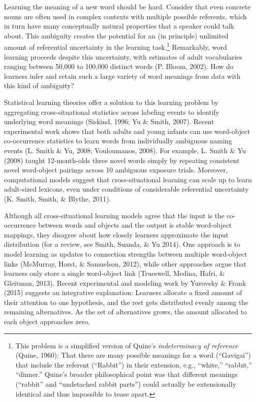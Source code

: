 \documentclass[authoryear, review]{elsarticle}
\begin{document}
Learning the meaning of a new word should be hard. Consider that even
concrete nouns are often used in complex contexts with multiple possible
referents, which in turn have many conceptually natural properties that
a speaker could talk about. This ambiguity creates the potential for an
(in principle) unlimited amount of referential uncertainty in the
learning task.\footnote{This problem is a simplified version of Quine's
  \textit{indeterminacy of reference} (Quine, 1960): That there are many
  possible meanings for a word (``Gavigai'') that include the referent
  (``Rabbit'') in their extension, e.g., ``white,'' ``rabbit,''
  ``dinner.'' Quine's broader philosophical point was that different
  meanings (``rabbit'' and ``undetached rabbit parts'') could actually
  be extensionally identical and thus impossible to tease apart.}
Remarkably, word learning proceeds despite this uncertainty, with
estimates of adult vocabularies ranging between 50,000 to 100,000
distinct words (P. Bloom, 2002). How do learners infer and retain such a
large variety of word meanings from data with this kind of ambiguity?

Statistical learning theories offer a solution to this learning problem
by aggregating cross-situational statistics across labeling events to
identify underlying word meanings (Siskind, 1996; Yu \& Smith, 2007).
Recent experimental work shows that both adults and young infants can
use word-object co-occurrence statistics to learn words from
individually ambiguous naming events (L. Smith \& Yu, 2008; Vouloumanos,
2008). For example, L. Smith \& Yu (2008) taught 12-month-olds three
novel words simply by repeating consistent novel word-object pairings
across 10 ambiguous exposure trials. Moreover, computational models
suggest that cross-situational learning can scale up to learn
adult-sized lexicons, even under conditions of considerable referential
uncertainty (K. Smith, Smith, \& Blythe, 2011).

Although all cross-situational learning models agree that the input is
the co-occurrence between words and objects and the output is stable
word-object mappings, they disagree about how closely learners
approximate the input distribution (for a review, see Smith, Suanda, \&
Yu 2014). One approach is to model learning as updates to connection
strengths between multiple word-object links (McMurray, Horst, \&
Samuelson, 2012), while other approaches argue that learners only store
a single word-object link (Trueswell, Medina, Hafri, \& Gleitman, 2013).
Recent experimental and modeling work by Yurovsky \& Frank (2015)
suggests an integrative explanation: Learners allocate a fixed amount of
their attention to one hypothesis, and the rest gets distributed evenly
among the remaining alternatives. As the set of alternatives grows, the
amount allocated to each object approaches zero.
\end{document}
